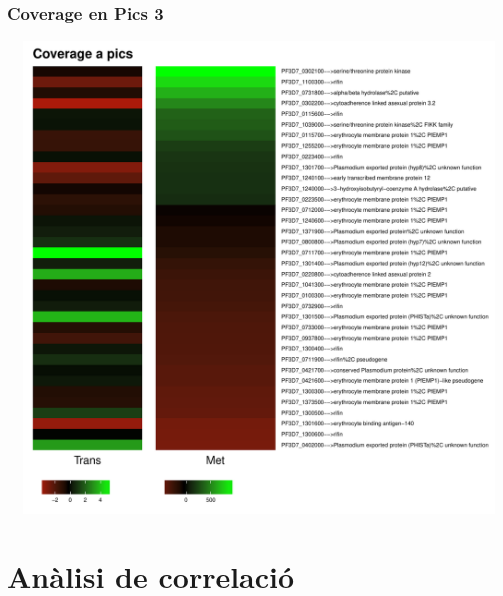\documentclass{article}\usepackage[]{graphicx}\usepackage[]{color}
\newenvironment{knitrout}{}{} %
\begin{document}
\subsubsection{Coverage en Pics 3}
\begin{knitrout}
\color{fgcolor}

{\centering \includegraphics[width=20cm,height=12.5cm]{figure/minimal-met_covapics_3-1} 

}



\end{knitrout}
\clearpage



\section{Anàlisi de correlació}
\end{document}

